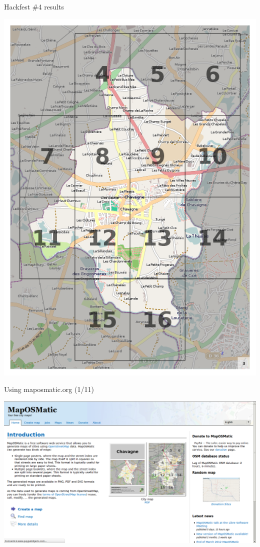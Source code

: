 \documentclass{beamer}
\begin{document}
\begin{frame}{Hackfest \#4 results}
\begin{center}
    \includegraphics[height=0.8\textheight]{chavagne-multi-page-overview.png}
  \end{center}
\end{frame}

\begin{frame}{Using maposmatic.org (1/11)}
  \begin{center}
    \includegraphics[width=\textwidth]{screenshot1.png}
  \end{center}
\end{frame}
\end{document}
